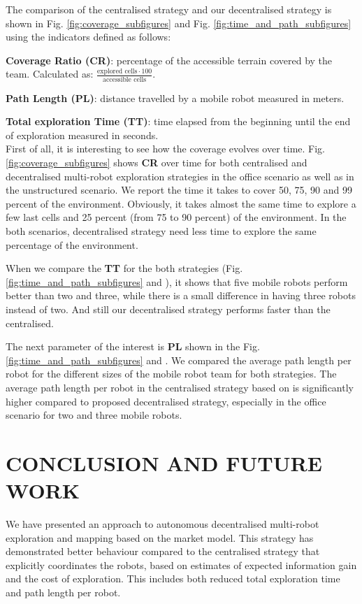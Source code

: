 \documentclass[letterpaper, 10 pt, conference]{ieeeconf}  %
\begin{document}
The comparison of the centralised strategy and our decentralised strategy is shown in Fig. \ref{fig:coverage_subfigures} and Fig. \ref{fig:time_and_path_subfigures} using the indicators defined as follows:

\textbf{Coverage Ratio (CR)}: percentage of the accessible terrain covered by the team. Calculated as:  \( \frac{\text{explored cells} \cdot 100}{\text{accessible cells}} \).

\textbf{Path Length (PL)}: distance travelled by a mobile robot measured in meters.

\textbf{Total exploration Time (TT)}: time elapsed from the beginning until the end of exploration measured in seconds.\\

First of all, it is interesting to see how the coverage evolves over time. Fig. \ref{fig:coverage_subfigures} shows \textbf{CR} over time for both centralised and decentralised multi-robot exploration strategies in the office scenario as well as in the unstructured scenario. We report the time it takes to cover 50, 75, 90 and 99 percent of the environment. Obviously, it takes almost the same time to explore a few last cells and 25 percent (from 75 to 90 percent) of the environment. In the both scenarios, decentralised strategy need less time to explore the same percentage of the environment.  

When we compare the \textbf{TT} for the both strategies (Fig. \ref{fig:time_and_path_subfigures}  and ), it shows that five mobile robots perform better than two and three, while there is a small difference in having three robots instead of two. And still our decentralised strategy performs faster than the centralised.

The next parameter of the interest is \textbf{PL} shown in the Fig. \ref{fig:time_and_path_subfigures}  and . We compared the average path length per robot for the different sizes of the mobile robot team for both strategies. The average path length per robot in the centralised strategy based on \cite{burgard} is significantly higher compared to proposed decentralised strategy, especially in the office scenario for two and three mobile robots. 



\section{CONCLUSION AND FUTURE WORK}
We have presented an approach to autonomous decentralised multi-robot exploration and mapping based on the market model. This strategy has demonstrated better behaviour compared to the centralised strategy that explicitly coordinates the robots, based on estimates of expected information gain and the cost of exploration. This includes both reduced total exploration time and path length per robot.
\end{document}
